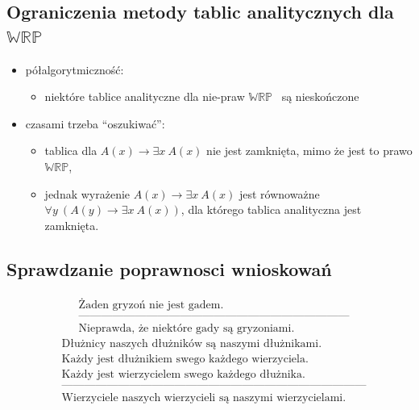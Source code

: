 \documentclass[12pt]{article}
\newcommand {\WRP} {\ensuremath{\mathbb{WRP}}}
\begin{document}
\subsection{Ograniczenia metody tablic analitycznych dla \WRP}
%
\begin{itemize}
\item półalgorytmiczność:
\begin{itemize}
\item niektóre tablice analityczne dla nie-praw \WRP~ są nieskończone
\end{itemize}
%
\item czasami trzeba ``oszukiwać'':
%
\begin{itemize}
\item tablica dla $A(x) \to \exists x~ A(x)$ nie jest zamknięta, mimo że jest to prawo \WRP,
%
\item jednak wyrażenie $A(x) \to \exists x~ A(x)$ jest równoważne $\forall y ~(A(y) \to \exists x~ A(x))$, dla którego tablica analityczna jest zamknięta.
\end{itemize}
\end{itemize}
%

\subsection{Sprawdzanie poprawnosci wnioskowań}
%
\begin{eqnarray*}
& \textrm{Żaden gryzoń nie jest gadem.} \nonumber \\
& \textrm{------------------------------------------------------------------------}\nonumber \\
& \textrm{Nieprawda, że niektóre gady są gryzoniami.}
\end{eqnarray*}
%
\begin{eqnarray*}
& \textrm{Dłużnicy naszych dłużników są naszymi dłużnikami.}\nonumber \\
& \textrm{Każdy jest dłużnikiem swego każdego wierzyciela.}\nonumber \\
& \textrm{Każdy jest wierzycielem swego każdego dłużnika.}\nonumber \\
& \textrm{---------------------------------------------------------------------------------}\nonumber \\
& \textrm{Wierzyciele naszych wierzycieli są naszymi wierzycielami.}
\end{eqnarray*}
%
\end{document}
